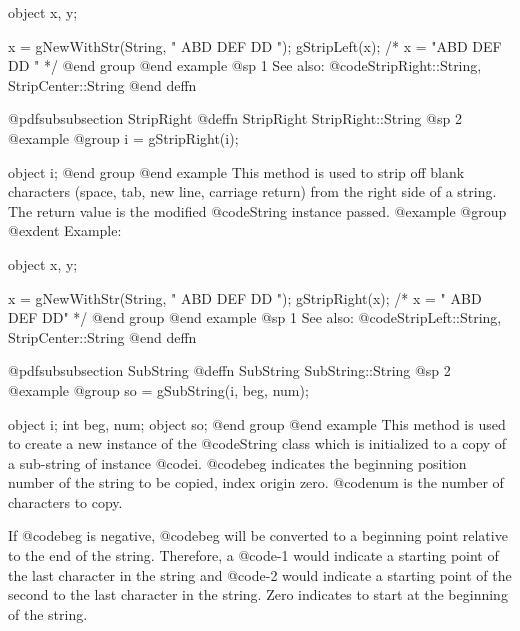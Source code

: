 object  x, y;

x = gNewWithStr(String, "    ABD  DEF  DD    ");
gStripLeft(x);   /*  x = "ABD  DEF  DD    "    */
@end group
@end example
@sp 1
See also:  @code{StripRight::String, StripCenter::String}
@end deffn










@pdfsubsubsection {StripRight}
@deffn {StripRight} StripRight::String
@sp 2
@example
@group
i = gStripRight(i);

object  i;
@end group
@end example
This method is used to strip off blank characters (space, tab, new line,
carriage return) from the right side of a string.  The return value is the
modified @code{String} instance passed.
@example
@group
@exdent Example:

object  x, y;

x = gNewWithStr(String, "    ABD  DEF  DD    ");
gStripRight(x);   /*  x = "    ABD  DEF  DD"    */
@end group
@end example
@sp 1
See also:  @code{StripLeft::String, StripCenter::String}
@end deffn























@pdfsubsubsection {SubString}
@deffn {SubString} SubString::String
@sp 2
@example
@group
so = gSubString(i, beg, num);

object  i;
int     beg, num;
object  so;
@end group
@end example
This method is used to create a new instance of the @code{String} class
which is initialized to a copy of a sub-string of instance @code{i}.
@code{beg} indicates the beginning position number of the string to be copied,
index origin zero.  @code{num} is the number of characters to copy.

If @code{beg} is negative, @code{beg} will be converted to a beginning point
relative to the end of the string.  Therefore, a @code{-1} would indicate
a starting point of the last character in the string and @code{-2} would
indicate a starting point of the second to the last character in the string.
Zero indicates to start at the beginning of the string.

